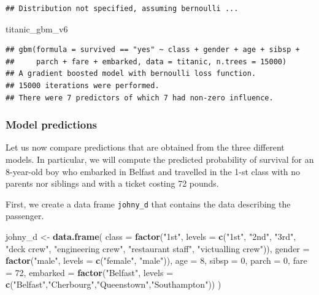\documentclass[12pt,]{krantz}
\newenvironment{Shaded}{\begin{snugshade}}{\end{snugshade}}
\newcommand{\DataTypeTok}[1]{\textcolor[rgb]{0.13,0.29,0.53}{#1}}
\newcommand{\DecValTok}[1]{\textcolor[rgb]{0.00,0.00,0.81}{#1}}
\newcommand{\KeywordTok}[1]{\textcolor[rgb]{0.13,0.29,0.53}{\textbf{#1}}}
\newcommand{\NormalTok}[1]{#1}
\newcommand{\StringTok}[1]{\textcolor[rgb]{0.31,0.60,0.02}{#1}}
\theoremstyle{definition}
\theoremstyle{definition}
\theoremstyle{definition}
\theoremstyle{remark}
\begin{document}
\begin{verbatim}
## Distribution not specified, assuming bernoulli ...
\end{verbatim}

\begin{Shaded}
\begin{Highlighting}[]
\NormalTok{titanic_gbm_v6}
\end{Highlighting}
\end{Shaded}

\begin{verbatim}
## gbm(formula = survived == "yes" ~ class + gender + age + sibsp + 
##     parch + fare + embarked, data = titanic, n.trees = 15000)
## A gradient boosted model with bernoulli loss function.
## 15000 iterations were performed.
## There were 7 predictors of which 7 had non-zero influence.
\end{verbatim}

\hypertarget{predictions-titanic}{%
\subsubsection{Model predictions}\label{predictions-titanic}}

Let us now compare predictions that are obtained from the three
different models. In particular, we will compute the predicted
probability of survival for an 8-year-old boy who embarked in Belfast
and travelled in the 1-st class with no parents nor siblings and with a
ticket costing 72 pounds.

First, we create a data frame \texttt{johny\_d} that contains the data
describing the passenger.

\begin{Shaded}
\begin{Highlighting}[]
\NormalTok{johny_d <-}\StringTok{ }\KeywordTok{data.frame}\NormalTok{(}
            \DataTypeTok{class =} \KeywordTok{factor}\NormalTok{(}\StringTok{"1st"}\NormalTok{, }\DataTypeTok{levels =} \KeywordTok{c}\NormalTok{(}\StringTok{"1st"}\NormalTok{, }\StringTok{"2nd"}\NormalTok{, }\StringTok{"3rd"}\NormalTok{, }\StringTok{"deck crew"}\NormalTok{, }\StringTok{"engineering crew"}\NormalTok{, }\StringTok{"restaurant staff"}\NormalTok{, }\StringTok{"victualling crew"}\NormalTok{)),}
            \DataTypeTok{gender =} \KeywordTok{factor}\NormalTok{(}\StringTok{"male"}\NormalTok{, }\DataTypeTok{levels =} \KeywordTok{c}\NormalTok{(}\StringTok{"female"}\NormalTok{, }\StringTok{"male"}\NormalTok{)),}
            \DataTypeTok{age =} \DecValTok{8}\NormalTok{,}
            \DataTypeTok{sibsp =} \DecValTok{0}\NormalTok{,}
            \DataTypeTok{parch =} \DecValTok{0}\NormalTok{,}
            \DataTypeTok{fare =} \DecValTok{72}\NormalTok{,}
            \DataTypeTok{embarked =} \KeywordTok{factor}\NormalTok{(}\StringTok{"Belfast"}\NormalTok{, }\DataTypeTok{levels =} \KeywordTok{c}\NormalTok{(}\StringTok{"Belfast"}\NormalTok{,}\StringTok{"Cherbourg"}\NormalTok{,}\StringTok{"Queenstown"}\NormalTok{,}\StringTok{"Southampton"}\NormalTok{))}
\NormalTok{)}
\end{Highlighting}
\end{Shaded}
\end{document}

